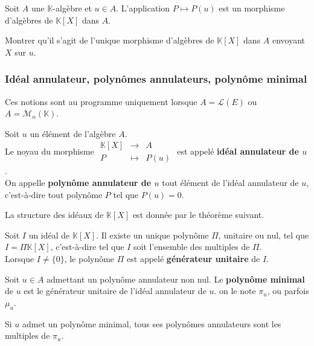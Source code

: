\documentclass[french]{article}
\newcommand{\K}{\mathbb{K}}
\theoremstyle{plain}
\theoremstyle{definition}
\theoremstyle{remark}
\begin{document}
\begin{prop}%
	Soit $A$ une $\K$-algèbre et $u\in A$. L'application $P\mapsto P(u)$ est un morphisme d'algèbres de $\K[X]$ dans $A$.
\end{prop}

\begin{exo}
	Montrer qu'il s'agit de l'unique morphisme d'algèbres de $\K[X]$ dans $A$ envoyant $X$ sur $u$.
\end{exo}

\subsubsection*{Idéal annulateur, polynômes annulateurs, polynôme minimal}

Ces notions sont au programme uniquement lorsque $A=\mathcal{L}(E)$ ou $A=\mathcal{M}_n(\K)$.

\begin{dfn}
	Soit $u$ un élément de l'algèbre $A$. \\ Le noyau du morphisme $\begin{array}{rcl}
		\K[X]&\longrightarrow&A\\
		P&\longmapsto&P(u)
	\end{array}$ est appelé \textbf{idéal annulateur de $u$}. \\ On appelle \textbf{polynôme annulateur de $u$} tout élément de l'idéal annulateur de $u$, c'est-à-dire tout polynôme $P$ tel que $P(u)=0$.
\end{dfn}

La structure des idéaux de $\K[X]$ est donnée par le théorème suivant.

\begin{thm}%
	Soit $I$ un idéal de $\K[X]$. Il existe un unique polynôme $\Pi$, unitaire ou nul, tel que $I=\Pi\K[X]$, c'est-à-dire tel que $I$ soit l'ensemble des multiples de $\Pi$. \\
	Lorsque $I\ne \{0\}$, le polynôme $\Pi$ est appelé \textbf{générateur unitaire} de $I$.
\end{thm}

\begin{dfn}
	Soit $u\in A$ admettant un polynôme annulateur non nul. Le \textbf{polynôme minimal} de $u$ est le générateur unitaire de l'idéal annulateur de $u$. on le note $\pi_u$, ou parfois $\mu_u$.
\end{dfn}

Si $u$ admet un polynôme minimal, tous ses polynômes annulateurs sont les multiples de $\pi_u$.
\end{document}
